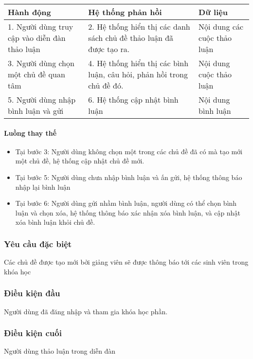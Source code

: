 \documentclass[./../main_file.tex]{subfiles}
\begin{document}
\begin{longtable}{|p{}|p{}|p{}|}
		\hline
		\textbf{Hành động}                  & \textbf{Hệ thống phản hồi}     & \textbf{Dữ liệu}   \\ \hline
		1. Người dùng truy cập vào diễn đàn thảo luận & 2. Hệ thống hiển thị các danh sách chủ đề thảo luận đã được tạo ra.    & Nội dung các cuộc thảo luận \\ \hline
		3. Người dùng chọn một chủ đề quan tâm        & 4. Hệ thống hiển thị các bình luận, câu hỏi, phản hồi trong chủ đề đó. & Nội dung cuộc thảo luận     \\ \hline
		5. Người dùng nhập bình luận và gửi & 6. Hệ thống cập nhật bình luận & Nội dung bình luận \\ \hline
\end{longtable}

\paragraph{Luồng thay thế}
\begin{itemize}
	\item Tại bước 3: Người dùng không chọn một trong các chủ đề đã có mà tạo mới một chủ đề, hệ thống cập nhật chủ đề mới.
	\item Tại bước 5: Người dùng chưa nhập bình luận và ấn gửi, hệ thống thông báo nhập lại bình luận
	\item Tại bước 6: Người dùng gửi nhầm bình luận, người dùng có thể chọn bình luận và chọn xóa, hệ thống thông báo xác nhận xóa bình luận, và cập nhật xóa bình luận khỏi chủ đề.
	
\end{itemize}
\subsubsection{Yêu cầu đặc biệt}
Các chủ đề được tạo mới bởi giảng viên sẽ được thông báo tới các sinh viên trong khóa học

\subsubsection{Điều kiện đầu}
Người dùng đã đăng nhập và tham gia khóa học phần.

\subsubsection{Điều kiện cuối}
Người dùng thảo luận trong diễn đàn
\end{document}
